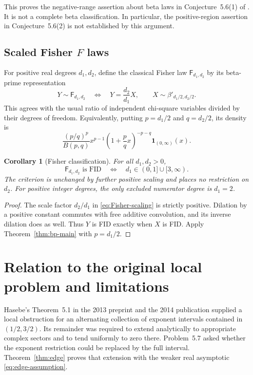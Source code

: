 \documentclass[11pt,a4paper]{article}
\newtheorem{corollary}[theorem]{Corollary}
\theoremstyle{definition}
\theoremstyle{remark}
\begin{document}
This proves the negative-range assertion about beta laws in
Conjecture~5.6(1) of \cite{Hasebe2013}. It is not a complete beta
classification. In particular, the positive-region assertion in
Conjecture~5.6(2) is not established by this argument.

\subsection{Scaled Fisher \texorpdfstring{$F$}{F} laws}

For positive real degrees $d_1,d_2$, define the classical Fisher law
$\mathsf F_{d_1,d_2}$ by its beta-prime representation
\begin{equation}\label{eq:Fisher-scaling}
 Y\sim\mathsf F_{d_1,d_2}\quad\Longleftrightarrow\quad
 Y=\frac{d_2}{d_1}X,\qquad
 X\sim\beta'_{d_1/2,d_2/2}.
\end{equation}
This agrees with the usual ratio of independent chi-square
variables divided by their degrees of freedom. Equivalently,
putting $p=d_1/2$ and $q=d_2/2$, its density is
\[
 \frac{(p/q)^p}{B(p,q)}
 x^{p-1}\left(1+\frac pqx\right)^{-p-q}
 \mathbf1_{(0,\infty)}(x).
\]

\begin{corollary}[Fisher classification]\label{cor:Fisher}
For all $d_1,d_2>0$,
\[
 \mathsf F_{d_1,d_2}\text{ is FID}
 \quad\Longleftrightarrow\quad
 d_1\in(0,1]\cup[3,\infty).
\]
The criterion is unchanged by further positive scaling and places
no restriction on $d_2$. For positive integer degrees, the only
excluded numerator degree is $d_1=2$.
\end{corollary}

\begin{proof}
The scale factor $d_2/d_1$ in \eqref{eq:Fisher-scaling} is
strictly positive. Dilation by a positive constant commutes with
free additive convolution, and its inverse dilation does as well.
Thus $Y$ is FID exactly when $X$ is FID. Apply
Theorem~\ref{thm:bp-main} with $p=d_1/2$.
\end{proof}

\section{Relation to the original local problem and limitations}

Hasebe's Theorem~5.1 in the 2013 preprint \cite{Hasebe2013} and
the 2014 publication \cite{Hasebe2014} supplied a local obstruction
for an alternating collection of exponent intervals contained in
$(1/2,3/2)$. Its remainder was required to extend analytically to
appropriate complex sectors and to tend uniformly to zero there.
Problem~5.7 asked whether the exponent restriction could be replaced
by the full interval. Theorem~\ref{thm:edge} proves that extension
with the weaker real asymptotic \eqref{eq:edge-assumption}.
\end{document}
